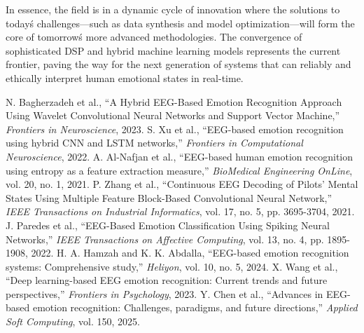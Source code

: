 \documentclass[conference]{IEEEtran}
\begin{document}
In essence, the field is in a dynamic cycle of innovation where the solutions to today\'s challenges—such as data synthesis and model optimization—will form the core of tomorrow\'s more advanced methodologies. The convergence of sophisticated DSP and hybrid machine learning models represents the current frontier, paving the way for the next generation of systems that can reliably and ethically interpret human emotional states in real-time.

\begin{thebibliography}{00}
 N. Bagherzadeh et al., ``A Hybrid EEG-Based Emotion Recognition Approach Using Wavelet Convolutional Neural Networks and Support Vector Machine,'' \textit{Frontiers in Neuroscience}, 2023.
 S. Xu et al., ``EEG-based emotion recognition using hybrid CNN and LSTM networks,'' \textit{Frontiers in Computational Neuroscience}, 2022.
 A. Al-Nafjan et al., ``EEG-based human emotion recognition using entropy as a feature extraction measure,'' \textit{BioMedical Engineering OnLine}, vol. 20, no. 1, 2021.
 P. Zhang et al., ``Continuous EEG Decoding of Pilots’ Mental States Using Multiple Feature Block-Based Convolutional Neural Network,'' \textit{IEEE Transactions on Industrial Informatics}, vol. 17, no. 5, pp. 3695-3704, 2021.
 J. Paredes et al., ``EEG-Based Emotion Classification Using Spiking Neural Networks,'' \textit{IEEE Transactions on Affective Computing}, vol. 13, no. 4, pp. 1895-1908, 2022.
 H. A. Hamzah and K. K. Abdalla, ``EEG-based emotion recognition systems: Comprehensive study,'' \textit{Heliyon}, vol. 10, no. 5, 2024.
 X. Wang et al., ``Deep learning-based EEG emotion recognition: Current trends and future perspectives,'' \textit{Frontiers in Psychology}, 2023.
 Y. Chen et al., ``Advances in EEG-based emotion recognition: Challenges, paradigms, and future directions,'' \textit{Applied Soft Computing}, vol. 150, 2025.
\end{thebibliography}
\end{document}
